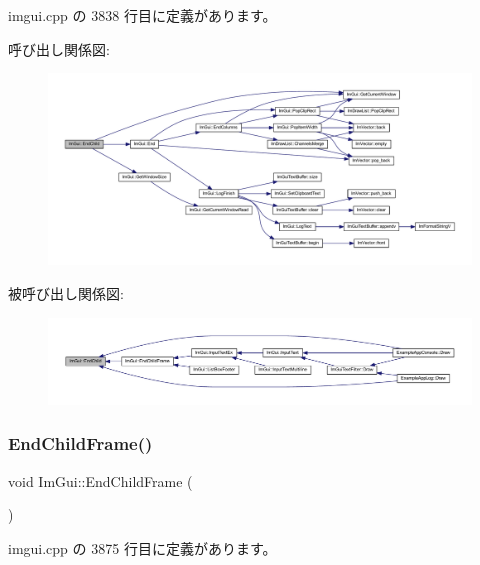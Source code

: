  imgui.\+cpp の 3838 行目に定義があります。

呼び出し関係図\+:\nopagebreak
\begin{figure}[H]
\begin{center}
\leavevmode
\includegraphics[width=350pt]{namespace_im_gui_af8de559a88c1442d6df8c1b04c86e997_cgraph}
\end{center}
\end{figure}
被呼び出し関係図\+:\nopagebreak
\begin{figure}[H]
\begin{center}
\leavevmode
\includegraphics[width=350pt]{namespace_im_gui_af8de559a88c1442d6df8c1b04c86e997_icgraph}
\end{center}
\end{figure}
\mbox{\label{namespace_im_gui_ac4bd9024554b5074805bc0ce3076c514}} 
\subsubsection{\texorpdfstring{End\+Child\+Frame()}{EndChildFrame()}}
{\footnotesize\ttfamily void Im\+Gui\+::\+End\+Child\+Frame (\begin{DoxyParamCaption}{ }\end{DoxyParamCaption})}



 imgui.\+cpp の 3875 行目に定義があります。

